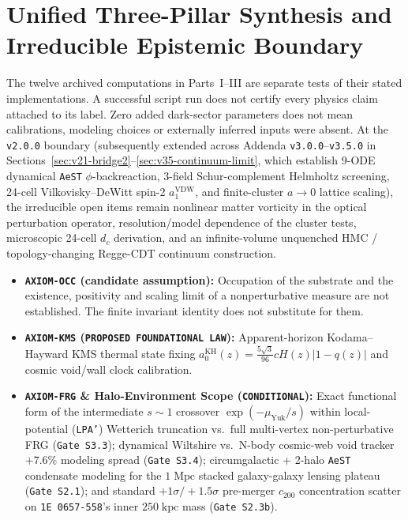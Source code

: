 \documentclass[11pt,a4paper]{article}
\begin{document}
\section{Unified Three-Pillar Synthesis and Irreducible Epistemic Boundary}
\label{sec:step3-synthesis}
The twelve archived computations in Parts~I--III are separate tests of their stated implementations. A successful script run does not certify every physics claim attached to its label. Zero added dark-sector parameters does not mean calibrations, modeling choices or externally inferred inputs were absent. At the \texttt{v2.0.0} boundary (subsequently extended across Addenda \texttt{v3.0.0}--\texttt{v3.5.0} in Sections~\ref{sec:v21-bridge2}--\ref{sec:v35-continuum-limit}, which establish 9-ODE dynamical \texttt{AeST} $\phi$-backreaction, 3-field Schur-complement Helmholtz screening, 24-cell Vilkovisky--DeWitt spin-2 $a_1^{\mathrm{VDW}}$, and finite-cluster $a\to 0$ lattice scaling), the irreducible open items remain nonlinear matter vorticity in the optical perturbation operator, resolution/model dependence of the cluster tests, microscopic 24-cell $d_c$ derivation, and an infinite-volume unquenched HMC / topology-changing Regge-CDT continuum construction.
\begin{itemize}\sloppy
    \item \textbf{\texttt{AXIOM-OCC} (candidate assumption):} Occupation of the substrate and the existence, positivity and scaling limit of a nonperturbative measure are not established. The finite invariant identity does not substitute for them.
    \item \textbf{\texttt{AXIOM-KMS} (\texttt{PROPOSED FOUNDATIONAL LAW}):} Apparent-horizon Kodama--Hayward KMS thermal state fixing $a_0^{\mathrm{KH}}(z) = \frac{5\sqrt{3}}{96}c H(z)|1 - q(z)|$ and cosmic void/wall clock calibration.
    \item \textbf{\texttt{AXIOM-FRG} \& Halo-Environment Scope (\texttt{CONDITIONAL}):} Exact functional form of the intermediate $s \sim 1$ crossover $\exp(-\mu_{\mathrm{Yuk}}/s)$ within local-potential (\texttt{LPA'}) Wetterich truncation vs.\ full multi-vertex non-perturbative FRG (\texttt{Gate S3.3}); dynamical Wiltshire vs.\ N-body cosmic-web void tracker $+7.6\%$ modeling spread (\texttt{Gate S3.4}); circumgalactic + 2-halo \texttt{AeST} condensate modeling for the $1\;\mathrm{Mpc}$ stacked galaxy-galaxy lensing plateau (\texttt{Gate S2.1}); and standard $+1\sigma/+1.5\sigma$ pre-merger $c_{200}$ concentration scatter on \texttt{1E~0657-558}'s inner $250\;\mathrm{kpc}$ mass (\texttt{Gate S2.3b}).
\end{itemize}
\end{document}

